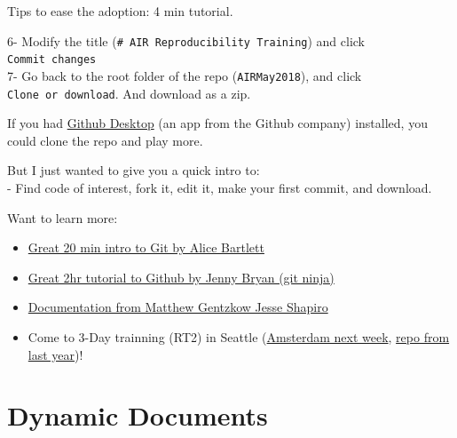 \documentclass[ignorenonframetext,]{beamer}
\begin{document}
\begin{frame}[fragile]{Tips to ease the adoption: 4 min tutorial.}
\protect\hypertarget{tips-to-ease-the-adoption-4-min-tutorial.-1}{}

6- Modify the title (\texttt{\#\ AIR\ Reproducibility\ Training}) and
click \texttt{Commit\ changes}\\
7- Go back to the root folder of the repo (\texttt{AIRMay2018}), and
click \texttt{Clone\ or\ download}. And download as a zip.

If you had \href{https://desktop.github.com/}{Github Desktop} (an app
from the Github company) installed, you could clone the repo and play
more.

But I just wanted to give you a quick intro to:\\
- Find code of interest, fork it, edit it, make your first commit, and
download.

\end{frame}

\begin{frame}{Want to learn more:}
\protect\hypertarget{want-to-learn-more}{}

\begin{itemize}
\item
  \href{https://www.youtube.com/watch?v=eWxxfttcMts}{Great 20 min intro
  to Git by Alice Bartlett}
\item
  \href{https://www.rstudio.com/resources/videos/happy-git-and-gihub-for-the-user-tutorial/}{Great
  2hr tutorial to Github by Jenny Bryan (git ninja)}
\item
  \href{http://web.stanford.edu/~gentzkow/research/CodeAndData.pdf}{Documentation
  from Matthew Gentzkow Jesse Shapiro}
\item
  Come to 3-Day trainning (RT2) in Seattle
  (\href{https://www.bitss.org/events/research-transparency-and-reproducibility-training-rt2-amsterdam/}{Amsterdam
  next week}, \href{https://github.com/BITSS/RT2Berkeley2017}{repo from
  last year})!
\end{itemize}

\end{frame}

\hypertarget{dynamic-documents}{%
\section{Dynamic Documents}\label{dynamic-documents}}
\end{document}
